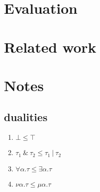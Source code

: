 \documentclass[sigplan,screen]{acmart}
\begin{document}
\section{Evaluation}

\section{Related work}

\section*{Notes}

\subsection*{dualities}
\begin{enumerate}
  \item \(\bot \leq \top \)
  \item \(\tau_1\ \&\ \tau_2  \leq \tau_1\ |\ \tau_2 \)
  \item \(\forall \alpha . \tau \leq \exists \alpha . \tau \)
  \item \(\nu \alpha . \tau \leq \mu \alpha . \tau \)
\end{enumerate}
\end{document}

